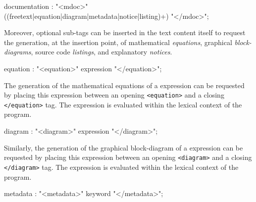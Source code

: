\begin{rail}
documentation : "<mdoc>" ((freetext|equation|diagram|metadata|notice|listing)+) "</mdoc>";
\end{rail}

Moreover, optional sub-tags can be inserted in the text content itself to request the generation, at the insertion point, of mathematical \textit{equations}, graphical \textit{block-diagrams}, \faust source code \textit{listings}, and explanatory \textit{notices}.


\begin{rail}
equation : "<equation>" expression "</equation>";
\end{rail}

The generation of the mathematical equations of a \faust expression can be requested by placing this expression between an opening \lstinline'<equation>' and a closing \lstinline'</equation>' tag. The expression is evaluated within the lexical context of the \faust program.


\begin{rail}
diagram : "<diagram>" expression "</diagram>";
\end{rail}

Similarly, the generation of the graphical block-diagram of a \faust expression can be requested by placing this expression between an opening \lstinline'<diagram>' and a closing \lstinline'</diagram>' tag. The expression is evaluated within the lexical context of the \faust program.


\begin{rail}
metadata : "<metadata>" keyword "</metadata>";
\end{rail}

